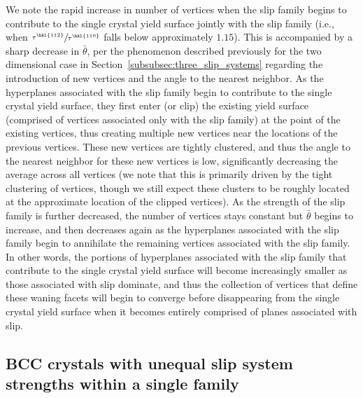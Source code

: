 \documentclass[preprint,3p,times,sort&compress,letterpaper,12pt]{elsarticle} %
\begin{document}
We note the rapid increase in number of vertices when the  slip family begins to contribute to the single crystal yield surface jointly with the  slip family (i.e., when $\sfrac{\tau^{\hkl{1 1 2}}}{\tau^{\hkl{1 1 0}}}$ falls below approximately $1.15$). This is accompanied by a sharp decrease in $\bar{\theta}$, per the phenomenon described previously for the two dimensional case in Section~\ref{subsubsec:three_slip_systems} regarding the introduction of new vertices and the angle to the nearest neighbor. As the hyperplanes associated with the  slip family begin to contribute to the single crystal yield surface, they first enter (or clip) the existing yield surface (comprised of vertices associated only with the  slip family) at the point of the existing vertices, thus creating multiple new vertices near the locations of the previous vertices. These new vertices are tightly clustered, and thus the angle to the nearest neighbor for these new vertices is low, significantly decreasing the average across all vertices (we note that this is primarily driven by the tight clustering of vertices, though we still expect these clusters to be roughly located at the approximate location of the clipped  vertices). As the strength of the  slip family is further decreased, the number of vertices stays constant but $\bar{\theta}$ begins to increase, and then decreases again as the hyperplanes associated with the  slip family begin to annihilate the remaining vertices associated with the  slip family. In other words, the portions of hyperplanes associated with the  slip family that contribute to the single crystal yield surface will become increasingly smaller as those associated with  slip dominate, and thus the collection of vertices that define these waning  facets will begin to converge before disappearing from the single crystal yield surface when it becomes entirely comprised of planes associated with  slip.

\subsection{BCC crystals with unequal slip system strengths within a single family}
\label{subsec:bcc_with_anisotropy}
\end{document}
